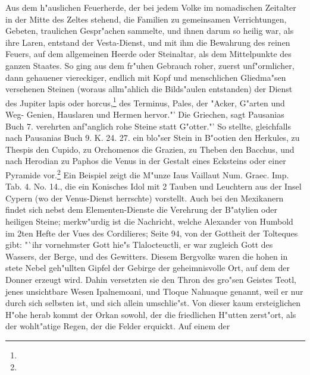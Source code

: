 \documentclass[a4paper, 11pt, oneside, polutonikogreek, german]{article}
\begin{document}
Aus dem h"auslichen Feuerherde, der bei jedem Volke im nomadischen Zeitalter in der Mitte des Zeltes stehend, die Familien zu gemeinsamen Verrichtungen, Gebeten, traulichen Gespr"achen sammelte, und ihnen darum so heilig war, als ihre Laren, entstand der Vesta-Dienst, und mit ihm die Bewahrung des reinen Feuers, auf dem allgemeinen Heerde oder Steinaltar, als dem Mittelpunkte des ganzen Staates. So ging aus dem fr"uhen Gebrauch roher, zuerst unf"ormlicher, dann gehauener viereckiger, endlich mit Kopf und menschlichen Gliedma"sen versehenen Steinen (woraus allm"ahlich die Bilds"aulen entstanden) der Dienst des Jupiter lapis oder horcus,\footnote{} des Terminus, Pales, der "Acker, G"arten und Weg- Genien, Hauslaren und Hermen hervor."' Die Griechen, sagt Pausanias Buch 7. verehrten anf"anglich rohe Steine statt G"otter."' So stellte, gleichfalls nach Pausanias Buch 9. K. 24. 27. ein blo"ser Stein in B"ootien den Herkules, zu Thespis den Cupido, zu Orchomenos die Grazien, zu Theben den Bacchus, und nach Herodian zu Paphos die Venus in der Gestalt eines Ecksteins oder einer Pyramide vor.\footnote{} Ein Beispiel zeigt die M"unze Iaus Vaillaut Num. Graec. Imp. Tab. 4. No. 14., die ein Konisches Idol mit 2 Tauben und Leuchtern aus der Insel Cypern (wo der Venus-Dienst herrschte) vorstellt. Auch bei den Mexikanern findet sich nebst dem Elementen-Dienste die Verehrung der B"atylien oder heiligen Steine; merkw"urdig ist die Nachricht, welche Alexander von Humbold im 2ten Hefte der Vues des Cordilieres; Seite 94, von der Gottheit der Tolteques gibt: "`ihr vornehmster Gott hie"s Tlalocteuctli, er war zugleich Gott des Wassers, der Berge, und des Gewitters. Diesem Bergvolke waren die hohen in stete Nebel geh"ullten Gipfel der Gebirge der geheimnisvolle Ort, auf dem der Donner erzeugt wird. Dahin versetzten sie den Thron des gro"sen Geistes Teotl, jenes unsichtbare Wesen Ipalnemoani, und Tloque Nahuaque genannt, weil er nur durch sich selbsten ist, und sich allein umschlie"st. Von dieser kaum ersteiglichen H"ohe herab kommt der Orkan sowohl, der die friedlichen H"utten zerst"ort, als der wohlt"atige Regen, der die Felder erquickt. Auf einem der 
\end{document}
